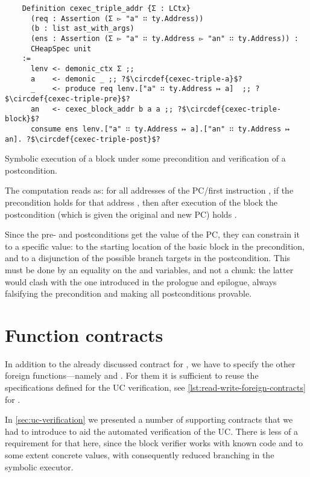 \begin{listing}[htb]
  \startcstep
  \begin{verbatim}
    Definition cexec_triple_addr {Σ : LCtx}
      (req : Assertion (Σ ▻ "a" ∷ ty.Address))
      (b : list ast_with_args)
      (ens : Assertion (Σ ▻ "a" ∷ ty.Address ▻ "an" ∷ ty.Address)) :
      CHeapSpec unit
    :=
      lenv <- demonic_ctx Σ ;;
      a    <- demonic _ ;; ?$\circdef{cexec-triple-a}$?
      _    <- produce req lenv.["a" ∷ ty.Address ↦ a]  ;; ?$\circdef{cexec-triple-pre}$?
      an   <- cexec_block_addr b a a ;; ?$\circdef{cexec-triple-block}$?
      consume ens lenv.["a" ∷ ty.Address ↦ a].["an" ∷ ty.Address ↦ an]. ?$\circdef{cexec-triple-post}$?
  \end{verbatim}
  \caption{Symbolic execution of a block under some precondition and verification of a postcondition.}
  \label{lst:cexec-triple}
\end{listing}

The computation reads as: for all addresses of the PC/first instruction , if the precondition holds for that address , then after execution of the block  the postcondition (which is given the original and new PC) holds .

Since the pre- and postconditions get the value of the PC, they can constrain it to a specific value: to the starting location of the basic block in the precondition, and to a disjunction of the possible branch targets in the postcondition. This must be done by an equality on the  and  variables, and not a  chunk: the latter would clash with the one introduced in the prologue and epilogue, always falsifying the precondition and making all postconditions provable.

\section{Function contracts}

In addition to the already discussed contract for , we have to specify the other foreign functions---namely  and . For them it is sufficient to reuse the specifications defined for the UC verification, see \cref{lst:read-write-foreign-contracts} for .

In \cref{sec:uc-verification} we presented a number of supporting contracts that we had to introduce to aid the automated verification of the UC. There is less of a requirement for that here, since the block verifier works with known code and to some extent concrete values, with consequently reduced branching in the symbolic executor.

